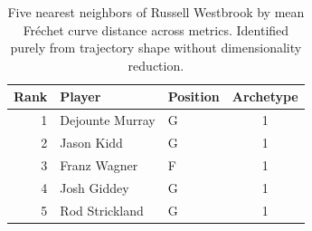 \begin{table}[htbp]
  \centering\small
  \begin{tabular}{rllc}
    \toprule
    Rank & Player & Position & Archetype \\
    \midrule
    1 & Dejounte Murray & G & 1 \\
    2 & Jason Kidd & G & 1 \\
    3 & Franz Wagner & F & 1 \\
    4 & Josh Giddey & G & 1 \\
    5 & Rod Strickland & G & 1 \\
    \bottomrule
  \end{tabular}
  \caption{Five nearest neighbors of Russell Westbrook by mean Fr\'{e}chet curve distance across metrics. Identified purely from trajectory shape without dimensionality reduction.}
  \label{tab:Russell_Westbrook_frechet_curve_neighbors}
\end{table}


